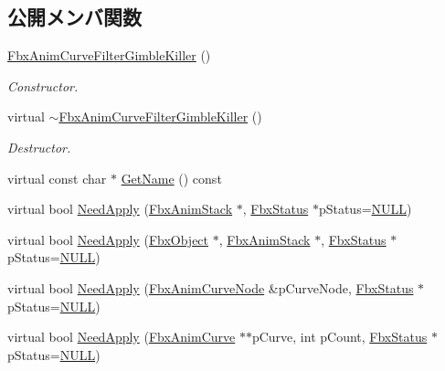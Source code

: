 \subsection*{公開メンバ関数}
\begin{DoxyCompactItemize}
\item 
\hyperlink{class_fbx_anim_curve_filter_gimble_killer_ae0a235ecc70b252fa50eb742727d4282}{Fbx\+Anim\+Curve\+Filter\+Gimble\+Killer} ()
\begin{DoxyCompactList}\small\item\em Constructor. \end{DoxyCompactList}\item 
virtual \hyperlink{class_fbx_anim_curve_filter_gimble_killer_ae4ac4f6824d0065e71139b985e8197b3}{$\sim$\+Fbx\+Anim\+Curve\+Filter\+Gimble\+Killer} ()
\begin{DoxyCompactList}\small\item\em Destructor. \end{DoxyCompactList}\item 
virtual const char $\ast$ \hyperlink{class_fbx_anim_curve_filter_gimble_killer_a224d34ab4b2a7f508de5679402c3711f}{Get\+Name} () const
\item 
virtual bool \hyperlink{class_fbx_anim_curve_filter_gimble_killer_a3b303b3383e638e445e0bd17570be9ea}{Need\+Apply} (\hyperlink{class_fbx_anim_stack}{Fbx\+Anim\+Stack} $\ast$, \hyperlink{class_fbx_status}{Fbx\+Status} $\ast$p\+Status=\hyperlink{fbxarch_8h_a070d2ce7b6bb7e5c05602aa8c308d0c4}{N\+U\+LL})
\item 
virtual bool \hyperlink{class_fbx_anim_curve_filter_gimble_killer_ad12554a479bc7a7cfd2fba457b051a5f}{Need\+Apply} (\hyperlink{class_fbx_object}{Fbx\+Object} $\ast$, \hyperlink{class_fbx_anim_stack}{Fbx\+Anim\+Stack} $\ast$, \hyperlink{class_fbx_status}{Fbx\+Status} $\ast$p\+Status=\hyperlink{fbxarch_8h_a070d2ce7b6bb7e5c05602aa8c308d0c4}{N\+U\+LL})
\item 
virtual bool \hyperlink{class_fbx_anim_curve_filter_gimble_killer_a72a761452f1a110353be0b6cae920e24}{Need\+Apply} (\hyperlink{class_fbx_anim_curve_node}{Fbx\+Anim\+Curve\+Node} \&p\+Curve\+Node, \hyperlink{class_fbx_status}{Fbx\+Status} $\ast$p\+Status=\hyperlink{fbxarch_8h_a070d2ce7b6bb7e5c05602aa8c308d0c4}{N\+U\+LL})
\item 
virtual bool \hyperlink{class_fbx_anim_curve_filter_gimble_killer_a7d9f7e30d2c8e4ec21e947ef0efaa314}{Need\+Apply} (\hyperlink{class_fbx_anim_curve}{Fbx\+Anim\+Curve} $\ast$$\ast$p\+Curve, int p\+Count, \hyperlink{class_fbx_status}{Fbx\+Status} $\ast$p\+Status=\hyperlink{fbxarch_8h_a070d2ce7b6bb7e5c05602aa8c308d0c4}{N\+U\+LL})
$$
\end{DoxyCompactItemize}
